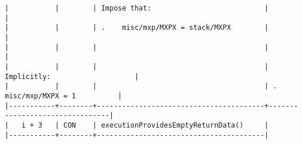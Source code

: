 \documentclass[varwidth=\maxdimen,margin=0.5cm,multi={verbatim}]{standalone}
\begin{document}
\begin{verbatim}
|           |        | Impose that:                           |                                |
|           |        | .    misc/mxp/MXPX = stack/MXPX        |                                |
|           |        |                                        |                                |
|           |        |                                        | Implicitly:                    |
|           |        |                                        | .   misc/mxp/MXPX = 1          |
|-----------+--------+----------------------------------------+--------------------------------|
|   i + 3   | CON    | executionProvidesEmptyReturnData()     |
|-----------+--------+----------------------------------------|

\end{verbatim}
\end{document}
